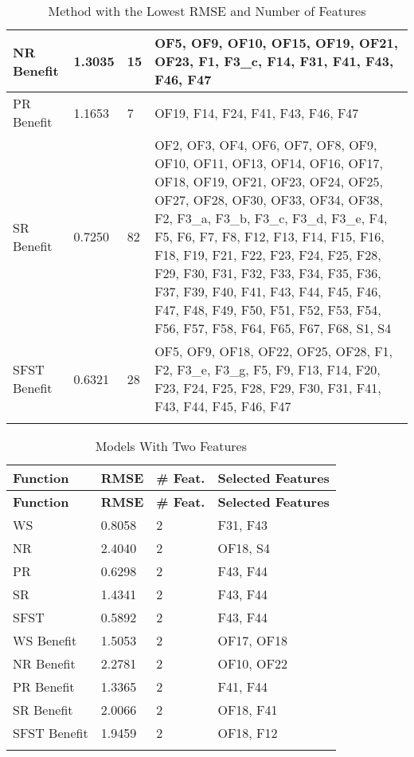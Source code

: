 \begin{longtable}{|p{3cm}|p{2cm}|p{2cm}|p{8cm}|}
NR Benefit & 1.3035 & 15 & OF5, OF9, OF10, OF15, OF19, OF21, OF23, F1, F3\_c, F14, F31, F41, F43, F46, F47 \\ \hline
PR Benefit & 1.1653 & 7 & OF19, F14, F24, F41, F43, F46, F47 \\ \hline
SR Benefit & 0.7250 & 82 & OF2, OF3, OF4, OF6, OF7, OF8, OF9, OF10, OF11, OF13, OF14, OF16, OF17, OF18, OF19, OF21, OF23, OF24, OF25, OF27, OF28, OF30, OF33, OF34, OF38, F2, F3\_a, F3\_b, F3\_c, F3\_d, F3\_e, F4, F5, F6, F7, F8, F12, F13, F14, F15, F16, F18, F19, F21, F22, F23, F24, F25, F28, F29, F30, F31, F32, F33, F34, F35, F36, F37, F39, F40, F41, F43, F44, F45, F46, F47, F48, F49, F50, F51, F52, F53, F54, F56, F57, F58, F64, F65, F67, F68, S1, S4 \\ \hline
SFST Benefit & 0.6321 & 28 & OF5, OF9, OF18, OF22, OF25, OF28, F1, F2, F3\_e, F3\_g, F5, F9, F13, F14, F20, F23, F24, F25, F28, F29, F30, F31, F41, F43, F44, F45, F46, F47 \\ \hline
\caption{Method with the Lowest RMSE and Number of Features}
\label{tab:lowest_rmse_feat}
\end{longtable}


\begin{longtable}{|p{3cm}|p{2cm}|p{2cm}|p{8cm}|}
\hline
\textbf{Function} & \textbf{RMSE} & \textbf{\# Feat.} & \textbf{Selected Features} \\ \hline
\endfirsthead
\hline
\textbf{Function} & \textbf{RMSE} & \textbf{\# Feat.} & \textbf{Selected Features} \\ \hline
\endhead

WS & 0.8058 & 2 & F31, F43 \\ \hline
NR & 2.4040 & 2 & OF18, S4 \\ \hline
PR & 0.6298 & 2 & F43, F44 \\ \hline
SR & 1.4341 & 2 & F43, F44 \\ \hline
SFST & 0.5892 & 2 & F43, F44 \\ \hline
WS Benefit & 1.5053 & 2 & OF17, OF18 \\ \hline
NR Benefit & 2.2781 & 2 & OF10, OF22 \\ \hline
PR Benefit & 1.3365 & 2 & F41, F44 \\ \hline
SR Benefit & 2.0066 & 2 & OF18, F41 \\ \hline
SFST Benefit & 1.9459 & 2 & OF18, F12 \\ \hline
\caption{Models With Two Features}
\label{tab:lowest_rmse_prop_feat}
\end{longtable}